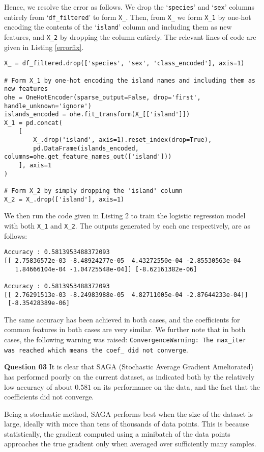\documentclass{article}[a4paper]
\begin{document}
	Hence, we resolve the error as follows. We drop the `\texttt{species}' and `\texttt{sex}' columns entirely from `\texttt{df\_filtered}' to form \texttt{X\_}. Then, from \texttt{X\_} we form \texttt{X\_1} by one-hot encoding the contents of the `\texttt{island}' column and including them as new features, and \texttt{X\_2} by dropping the column entirely. The relevant lines of code are given in Listing \ref{errorfix}.

	\begin{lstlisting}[caption={Fix for the error}, label=errorfix]
X_ = df_filtered.drop(['species', 'sex', 'class_encoded'], axis=1)

# Form X_1 by one-hot encoding the island names and including them as new features
ohe = OneHotEncoder(sparse_output=False, drop='first', handle_unknown='ignore')
islands_encoded = ohe.fit_transform(X_[['island']])
X_1 = pd.concat(
    [
        X_.drop('island', axis=1).reset_index(drop=True),
        pd.DataFrame(islands_encoded, columns=ohe.get_feature_names_out(['island']))
    ], axis=1
)

# Form X_2 by simply dropping the 'island' column
X_2 = X_.drop(['island'], axis=1)
	\end{lstlisting}

	We then run the code given in Listing 2 to train the logistic regression model with both \texttt{X\_1} and \texttt{X\_2}. The outputs generated by each one respectively, are as follows:
	\begin{verbatim}
Accuracy : 0.5813953488372093
[[ 2.75836572e-03 -8.48924277e-05  4.43272550e-04 -2.85530563e-04
   1.84666104e-04 -1.04725548e-04]] [-8.62161382e-06]

Accuracy : 0.5813953488372093
[[ 2.76291513e-03 -8.24983988e-05  4.82711005e-04 -2.87644233e-04]]
 [-8.35428389e-06]
\end{verbatim}
	The same accuracy has been achieved in both cases, and the coefficients for common features in both cases are very similar. We further note that in both cases, the following warning was raised: \texttt{ConvergenceWarning: The max\_iter was reached which means the coef\_ did not converge}.
	\medskip

	\textbf{Question 03} It is clear that SAGA (Stochastic Average Gradient Ameliorated) has performed poorly on the current dataset, as indicated both by the relatively low accuracy of about $0.581$ on its performance on the data, and the fact that the coefficients did not converge.

	Being a stochastic method, SAGA performs best when the size of the dataset is large, ideally with more than tens of thousands of data points. This is because statistically, the gradient computed using a minibatch of the data points approaches the true gradient only when averaged over sufficiently many samples.
\end{document}
